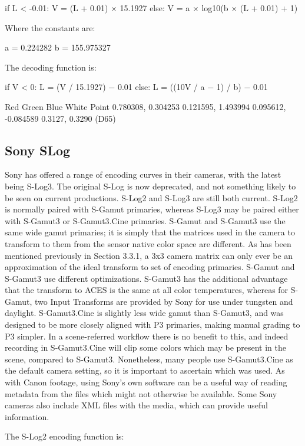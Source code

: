 	if L < -0.01:
		V = (L + 0.01) × 15.1927
	else:
		V = a × log10(b × (L + 0.01) + 1)

Where the constants are:

	a = 0.224282
b = 155.975327



The decoding function is:

	if V < 0:
		L = (V / 15.1927) − 0.01
	else:
		L = ((10V / a − 1) / b) − 0.01


Red
Green
Blue
White Point
0.780308, 0.304253
0.121595, 1.493994
0.095612, -0.084589
0.3127, 0.3290 (D65)

\subsection{Sony SLog}
\label{subsec:sony-slog}

Sony has offered a range of encoding curves in their cameras, with the latest being S-Log3. The original S-Log is now deprecated, and not something likely to be seen on current productions. S-Log2 and S-Log3 are still both current. S-Log2 is normally paired with S-Gamut primaries, whereas S-Log3 may be paired either with S-Gamut3 or S-Gamut3.Cine primaries. S-Gamut and S-Gamut3 use the same wide gamut primaries; it is simply that the matrices used in the camera to transform to them from the sensor native color space are different. As has been mentioned previously in Section 3.3.1, a 3x3 camera matrix can only ever be an approximation of the ideal transform to set of encoding primaries. S-Gamut and S-Gamut3 use different optimizations. S-Gamut3 has the additional advantage that the transform to ACES is the same at all color temperatures, whereas for S-Gamut, two Input Transforms are provided by Sony for use under tungsten and daylight. S-Gamut3.Cine is slightly less wide gamut than S-Gamut3, and was designed to be more closely aligned with P3 primaries, making manual grading to P3 simpler. In a scene-referred workflow there is no benefit to this, and indeed recording in S-Gamut3.Cine will clip some colors which may be present in the scene, compared to S-Gamut3. Nonetheless, many people use S-Gamut3.Cine as the default camera setting, so it is important to ascertain which was used. As with Canon footage, using Sony’s own software can be a useful way of reading metadata from the files which might not otherwise be available. Some Sony cameras also include XML files with the media, which can provide useful information.

The S-Log2 encoding function is:

